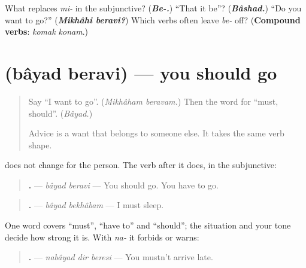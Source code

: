 \begin{tcolorbox}[breakable,colback=teal!4,colframe=teal!35!black,title={Before you move on}]
What replaces \emph{mi-} in the subjunctive? (\emph{\textbf{Be-.}}) \textquotedblleft{}That it be\textquotedblright{}? (\emph{\textbf{Bâshad.}}) \textquotedblleft{}Do you want to go?\textquotedblright{} (\emph{\textbf{Mikhâhi beravi?}}) Which verbs often leave \emph{be-} off? (\textbf{Compound verbs}: \emph{komak konam}.)
\end{tcolorbox}
\section[\texorpdfstring{\fa{باید} \fa{بروی} (bâyad beravi)}{باید بروی (bâyad beravi)}]{  (bâyad beravi) — you should go}

\label{lesson:FA-C293-bayad-beravi}



\begin{quote}
Say \textquotedblleft{}I want to go\textquotedblright{}. (\emph{Mikhâham beravam.}) Then the word for \textquotedblleft{}must, should\textquotedblright{}. (\emph{Bâyad.})

Advice is a want that belongs to someone else. It takes the same verb shape.
\end{quote}

\begin{grammarlens}[title={Grammar Lens: bâyad, and the verb that carries the person}]
\textbf{} does not change for the person. The verb after it does, in the subjunctive:

\begin{quote}
\textbf{ .} — \emph{bâyad beravi} — You should go. You have to go.
\end{quote}

\begin{quote}
\textbf{ .} — \emph{bâyad bekhâbam} — I must sleep.
\end{quote}

One word covers \textquotedblleft{}must\textquotedblright{}, \textquotedblleft{}have to\textquotedblright{} and \textquotedblleft{}should\textquotedblright{}; the situation and your tone decide how strong it is. With \emph{na-} it forbids or warns:

\begin{quote}
\textbf{  .} — \emph{nabâyad dir beresi} — You mustn't arrive late.
\end{quote}
\end{grammarlens}

